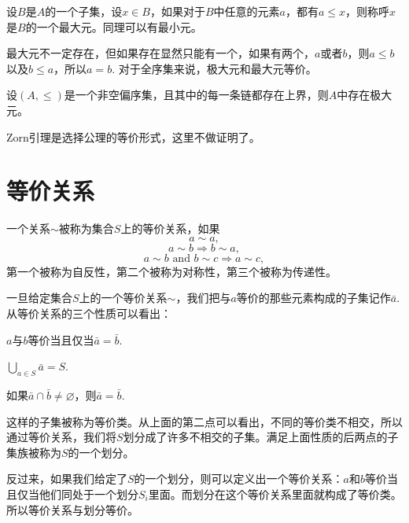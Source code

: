 \para 设$B$是$A$的一个子集，设$x\in B$，如果对于$B$中任意的元素$a$，都有$a\leq x$，则称呼$x$是$B$的一个最大元。同理可以有最小元。

最大元不一定存在，但如果存在显然只能有一个，如果有两个，$a$或者$b$，则$a\leq b$以及$b\leq a$，所以$a=b$. 对于全序集来说，极大元和最大元等价。

\begin{thm}[Zorn引理]
设$(A,\leq)$是一个非空偏序集，且其中的每一条链都存在上界，则$A$中存在极大元。
\end{thm}

Zorn引理是选择公理的等价形式，这里不做证明了。

\section{等价关系}
\para 一个关系$\sim$被称为集合$S$上的等价关系，如果
\[
	a\sim a,
\]
\[
	a\sim b \Rightarrow b \sim a,
\]
\[
	a\sim b\text{ and } b\sim c \Rightarrow a \sim c,
\]
第一个被称为自反性，第二个被称为对称性，第三个被称为传递性。

\para 一旦给定集合$S$上的一个等价关系$\sim$，我们把与$a$等价的那些元素构成的子集记作$\bar{a}$. 从等价关系的三个性质可以看出：
\begin{compactitem}
\item $a$与$b$等价当且仅当$\bar{a}=\bar{b}$. 
\item $\bigcup_{a\in S}\bar{a}=S$.
\item 如果$\bar{a}\cap \bar{b}\neq \varnothing$，则$\bar{a}=\bar{b}$.
\end{compactitem}
这样的子集被称为等价类。从上面的第二点可以看出，不同的等价类不相交，所以通过等价关系，我们将$S$划分成了许多不相交的子集。满足上面性质的后两点的子集族被称为$S$的一个划分。

\para 反过来，如果我们给定了$S$的一个划分，则可以定义出一个等价关系：$a$和$b$等价当且仅当他们同处于一个划分$S_i$里面。而划分在这个等价关系里面就构成了等价类。所以等价关系与划分等价。
